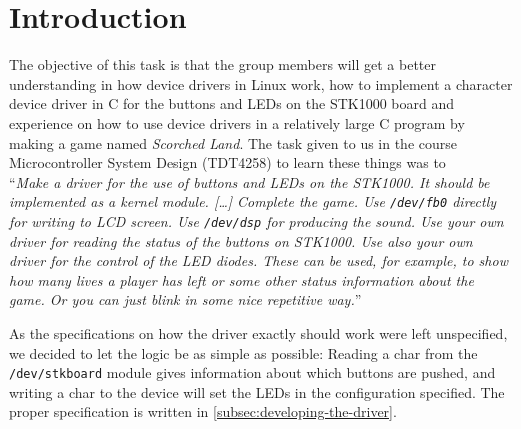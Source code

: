 \section{Introduction}

The objective of this task is that the group members will get a better
understanding in how device drivers in Linux work, how to implement a
character device driver in C for the buttons and LEDs on the STK1000
board and experience on how to use device drivers in a relatively large
C program by making a game named {\em Scorched Land}. The task given to
us in the course Microcontroller System Design (TDT4258) to learn these
things was to \\
``{\em Make a driver for the use of buttons and LEDs on the STK1000. It
should be implemented as a kernel module. [\ldots] Complete the game.
Use \texttt{/dev/fb0} directly for writing to LCD screen. Use
\texttt{/dev/dsp} for producing the sound. Use your own driver for
reading the status of the buttons on STK1000. Use also your own driver
for the control of the LED diodes.  These can be used, for example, to
show how many lives a player has left or some other status information
about the game. Or you can just blink in some nice repetitive
way.}''\cite{comp}

As the specifications on how the driver exactly should work were left
unspecified, we decided to let the logic be as simple as possible:
Reading a char from the \texttt{/dev/stkboard} module gives information
about which buttons are pushed, and writing a char to the device will
set the LEDs in the configuration specified. The proper specification is
written in \ref{subsec:developing-the-driver}.
\begin{comment}
\begin{itemize} %
\item Reading one char from the device will give you the bitmask of the
buttons pressed - for instance would 129 (\texttt{1000 0001}) mean that
only button 7 and 0 are pushed. 
\item Writing one char to the device will write the bitmask of the LEDs
in the same way you read the buttons pressed from the device - if you
write the char 66 (\texttt{0100 0010}) to the device, then LED 6 and 1
will be lit while the others will be turned off if they aren't already
off. Notice that there's no way to read the LEDs from the device, as
this was not a specification requirement. To do that in a program, we
would save the current configuration of the LEDs we just wrote.
\end{itemize}
\end{comment}


